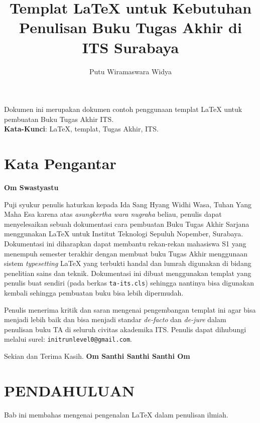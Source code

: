 \documentclass{ta-scientics-matematika-its}
\title{Templat \LaTeX{} untuk Kebutuhan Penulisan Buku Tugas Akhir di ITS Surabaya}{A \LaTeX{} Template for Setting Up a Final Project Booklet for ITS Surabaya}{Kxxxxx}
\author{Putu Wiramaswara Widya}{5111100012}
\begin{document}
    \frontmatter %
    \maketitle
    \legalityPaper %
    \begin{abstrak}
    	Dokumen ini merupakan dokumen contoh penggunaan templat \LaTeX{} untuk pembuatan Buku Tugas Akhir ITS. \\

    	\noindent \textbf{Kata-Kunci}: \LaTeX{}, templat, Tugas Akhir, ITS.
	\end{abstrak}
    \chapter{Kata Pengantar}
        \textbf{Om Swastyastu}

        Puji syukur penulis haturkan kepada Ida Sang Hyang Widhi Wasa, Tuhan Yang Maha Esa karena atas \emph{asungkertha wara nugraha} beliau, penulis dapat menyelesaikan sebuah dokumentasi cara pembuatan Buku Tugas Akhir Sarjana menggunakan \LaTeX{} untuk Institut Teknologi Sepuluh Nopember, Surabaya. Dokumentasi ini diharapkan dapat membantu rekan-rekan mahasiswa S1 yang menempuh semester terakhir dengan membuat buku Tugas Akhir menggunaan sistem \emph{typesetting} \LaTeX{} yang terbukti handal dan lumrah digunakan di bidang penelitian sains dan teknik. Dokumentasi ini dibuat menggunakan templat yang penulis buat sendiri (pada berkas \texttt{ta-its.cls}) sehingga nantinya bisa digunakan kembali sehingga pembuatan buku bisa lebih dipermudah.

        Penulis menerima kritik dan saran mengenai pengembangan templat ini agar bisa menjadi lebih baik dan bisa menjadi standar \emph{de-facto} dan \emph{de-jure} dalam penulisan buku TA di seluruh civitas akademika ITS. Penulis dapat dihubungi melalui surel: \texttt{initrunlevel0@gmail.com}.

        Sekian dan Terima Kasih.
        \noindent \textbf{Om Santhi Santhi Santhi Om}

        \cleardoublepage %

    \tableofcontents %
    \listoftables %
    \listoffigures %

\mainmatter %
    \chapter{PENDAHULUAN}
        Bab ini membahas mengenai pengenalan \LaTeX{} dalam penulisan ilmiah.
\end{document}
